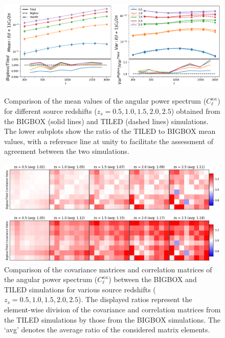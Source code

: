 \begin{figure}[p]
    \centering
    \includegraphics[width=\textwidth]{figures/results/cl_main.png}
    \caption[$C_\ell^{\kappa\kappa}$ Mean and Variance]{Comparison of the mean values of the angular power spectrum ($C^{\kappa\kappa}_{\ell}$) for different source redshifts ($z_s = 0.5, 1.0, 1.5, 2.0, 2.5$) obtained from the BIGBOX (solid lines) and TILED (dashed lines) simulations. The lower subplots show the ratio of the TILED to BIGBOX mean values, with a reference line at unity to facilitate the assessment of agreement between the two simulations.}
    \label{fig:cl_main}
    \vspace{2cm}
    \includegraphics[width=\textwidth]{figures/results/cl_cov.png}
    \caption[$C_\ell^{\kappa\kappa}$ Correlation and Covariance Ratio]{Comparison of the covariance matrices and correlation matrices of the angular power spectrum ($C^{\kappa\kappa}_{\ell}$) between the BIGBOX and TILED simulations for various source redshifts ($z_s = 0.5, 1.0, 1.5, 2.0, 2.5$). The displayed ratios represent the element-wise division of the covariance and correlation matrices from the TILED simulations by those from the BIGBOX simulations. The `avg' denotes the average ratio of the considered matrix elements.}
    \label{fig:cl_cov}
\end{figure}

